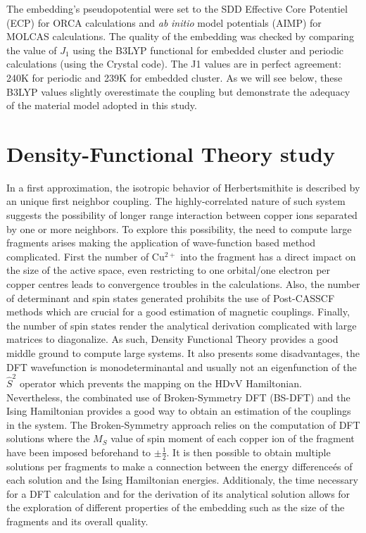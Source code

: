 \documentclass[10pt]{report}
\numberwithin{equation}{section}
\begin{document}
The embedding's pseudopotential were set to the SDD Effective Core Potentiel (ECP) for ORCA calculations and \textit{ab} \textit{initio} model potentials (AIMP) for MOLCAS calculations. 
The quality of the embedding was checked by comparing the value of $J_1$ using the B3LYP functional for embedded cluster and periodic calculations (using the Crystal code). 
The J1 values are in perfect agreement: 240K for periodic and 239K for embedded cluster. 
As we will see below, these B3LYP values slightly overestimate the coupling but demonstrate the adequacy of the material model adopted in this study.

\section{Density-Functional Theory study}

In a first approximation, the isotropic behavior of Herbertsmithite is described by an unique first neighbor coupling. 
The highly-correlated nature of such system suggests the possibility of longer range interaction between copper ions separated by one or more neighbors. 
To explore this possibility, the need to compute large fragments arises making the application of wave-function based method complicated.
First the number of Cu$^{2+}$ into the fragment has a direct impact on the size of the active space, even restricting to one orbital/one electron per copper centres leads to convergence troubles in the calculations.
Also, the number of determinant and spin states generated prohibits the use of Post-CASSCF methods which are crucial for a good estimation of magnetic couplings.
Finally, the number of spin states render the analytical derivation complicated with large matrices to diagonalize.
As such, Density Functional Theory provides a good middle ground to compute large systems. 
It also presents some disadvantages, the DFT wavefunction is monodeterminantal and usually not an eigenfunction of the $\hat{S}^2$ operator which prevents the mapping on the HDvV Hamiltonian.
Nevertheless, the combinated use of Broken-Symmetry DFT (BS-DFT) and the Ising Hamiltonian provides a good way to obtain an estimation of the couplings in the system.
The Broken-Symmetry approach relies on the computation of DFT solutions where the $M_S$ value of spin moment of each copper ion of the fragment have been imposed beforehand to $\pm \frac{1}{2}$. 
It is then possible to obtain multiple solutions per fragments to make a connection between the energy differenceés of each solution and the Ising Hamiltonian energies.
Additionaly, the time necessary for a DFT calculation and for the derivation of its analytical solution allows for the exploration of different properties of the embedding such as the size of the fragments and its overall quality.
\end{document}
